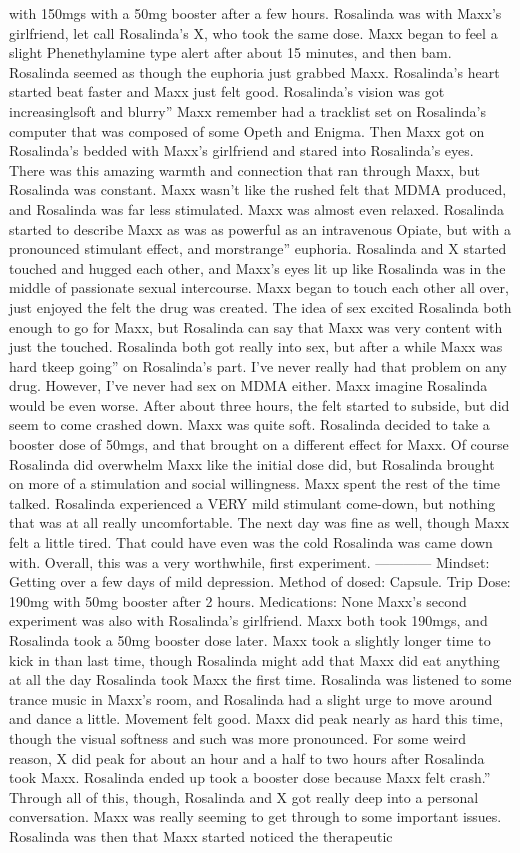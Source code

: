 \documentclass[12pt]{book}
\begin{document}
with 150mgs with a 50mg booster after a few hours. Rosalinda was with Maxx's girlfriend, let call Rosalinda's X, who took the same dose. Maxx began to feel a slight Phenethylamine type alert after about 15 minutes, and then bam. Rosalinda seemed as though the euphoria just grabbed Maxx. Rosalinda's heart started beat faster and Maxx just felt good. Rosalinda's vision was got increasinglsoft and blurry'' Maxx remember had a tracklist set on Rosalinda's computer that was composed of some Opeth and Enigma. Then Maxx got on Rosalinda's bedded with Maxx's girlfriend and stared into Rosalinda's eyes. There was this amazing warmth and connection that ran through Maxx, but Rosalinda was constant. Maxx wasn't like the rushed felt that MDMA produced, and Rosalinda was far less stimulated. Maxx was almost even relaxed. Rosalinda started to describe Maxx as was as powerful as an intravenous Opiate, but with a pronounced stimulant effect, and morstrange'' euphoria. Rosalinda and X started touched and hugged each other, and Maxx's eyes lit up like Rosalinda was in the middle of passionate sexual intercourse. Maxx began to touch each other all over, just enjoyed the felt the drug was created. The idea of sex excited Rosalinda both enough to go for Maxx, but Rosalinda can say that Maxx was very content with just the touched. Rosalinda both got really into sex, but after a while Maxx was hard tkeep going'' on Rosalinda's part. I've never really had that problem on any drug. However, I've never had sex on MDMA either. Maxx imagine Rosalinda would be even worse. After about three hours, the felt started to subside, but did seem to come crashed down. Maxx was quite soft. Rosalinda decided to take a booster dose of 50mgs, and that brought on a different effect for Maxx. Of course Rosalinda did overwhelm Maxx like the initial dose did, but Rosalinda brought on more of a stimulation and social willingness. Maxx spent the rest of the time talked. Rosalinda experienced a VERY mild stimulant come-down, but nothing that was at all really uncomfortable. The next day was fine as well, though Maxx felt a little tired. That could have even was the cold Rosalinda was came down with. Overall, this was a very worthwhile, first experiment. ------------ Mindset: Getting over a few days of mild depression. Method of dosed: Capsule. Trip Dose: 190mg with 50mg booster after 2 hours. Medications: None Maxx's second experiment was also with Rosalinda's girlfriend. Maxx both took 190mgs, and Rosalinda took a 50mg booster dose later. Maxx took a slightly longer time to kick in than last time, though Rosalinda might add that Maxx did eat anything at all the day Rosalinda took Maxx the first time. Rosalinda was listened to some trance music in Maxx's room, and Rosalinda had a slight urge to move around and dance a little. Movement felt good. Maxx did peak nearly as hard this time, though the visual softness and such was more pronounced. For some weird reason, X did peak for about an hour and a half to two hours after Rosalinda took Maxx. Rosalinda ended up took a booster dose because Maxx felt crash.'' Through all of this, though, Rosalinda and X got really deep into a personal conversation. Maxx was really seeming to get through to some important issues. Rosalinda was then that Maxx started noticed the therapeutic 
\end{document}
